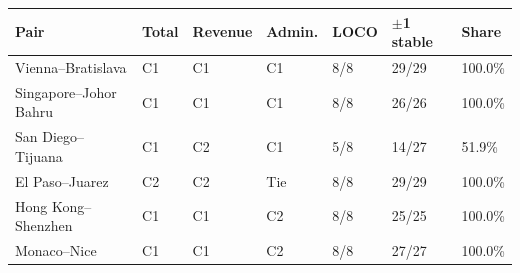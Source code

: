 \begin{tabular}{@{}lllllll@{}}\toprule
Pair & Total & Revenue & Admin. & LOCO & $\pm$1 stable & Share \\
\midrule
Vienna--Bratislava & C1 & C1 & C1 & 8/8 & 29/29 & 100.0\% \\
Singapore--Johor Bahru & C1 & C1 & C1 & 8/8 & 26/26 & 100.0\% \\
San Diego--Tijuana & C1 & C2 & C1 & 5/8 & 14/27 & 51.9\% \\
El Paso--Juarez & C2 & C2 & Tie & 8/8 & 29/29 & 100.0\% \\
Hong Kong--Shenzhen & C1 & C1 & C2 & 8/8 & 25/25 & 100.0\% \\
Monaco--Nice & C1 & C1 & C2 & 8/8 & 27/27 & 100.0\% \\
\bottomrule
\end{tabular}
